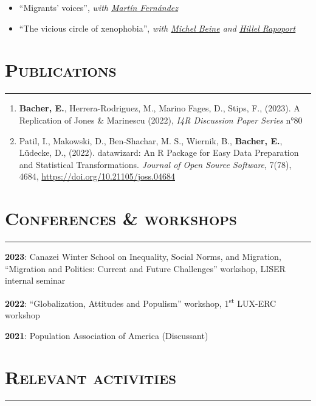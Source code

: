 \documentclass{article}
\newcommand{\sectionline}{%
  \vspace{-0.6cm}%
  \par\noindent\rule{\textwidth}{0.4pt}%
  \vspace{0.3cm}%
}
\let\xsection=\section
\renewcommand{\section}[1]{%
  \vspace{0.4cm}%
  \xsection*{\scshape{#1}}%
  \sectionline%
}
\begin{document}
\begin{itemize}
\item
  ``Migrants' voices'', \emph{with
  \href{https://sites.google.com/view/martinfernandezsanchez/}{Martín
  Fernández}}
\item
  ``The vicious circle of xenophobia'', \emph{with
  \href{https://sites.google.com/site/michelbeineeconomics/home}{Michel
  Beine} and
  \href{https://www.parisschoolofeconomics.eu/en/rapoport-hillel/}{Hillel
  Rapoport}}
\end{itemize}

\section{Publications}

\begin{enumerate}
\def\labelenumi{\arabic{enumi}.}
\item
  \textbf{Bacher, E.}, Herrera-Rodriguez, M., Marino Fages, D., Stips,
  F., (2023). A Replication of Jones \& Marinescu (2022), \emph{I4R
  Discussion Paper Series} n°80
\item
  Patil, I., Makowski, D., Ben-Shachar, M. S., Wiernik, B.,
  \textbf{Bacher, E.}, Lüdecke, D., (2022). datawizard: An R Package for
  Easy Data Preparation and Statistical Transformations. \emph{Journal
  of Open Source Software}, 7(78), 4684,
  \url{https://doi.org/10.21105/joss.04684}
\end{enumerate}

\hypertarget{conferences-workshops}{%
\section{Conferences \& workshops}\label{conferences-workshops}}

\textbf{2023}: Canazei Winter School on Inequality, Social Norms, and
Migration, ``Migration and Politics: Current and Future Challenges''
workshop, LISER internal seminar

\textbf{2022}: ``Globalization, Attitudes and Populism'' workshop,
1\textsuperscript{st} LUX-ERC workshop

\textbf{2021}: Population Association of America (Discussant)

\hypertarget{relevant-activities}{%
\section{Relevant activities}\label{relevant-activities}}
\end{document}

